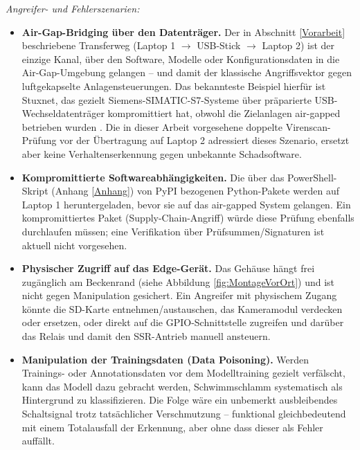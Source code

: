 \textit{Angreifer- und Fehlerszenarien:}
\begin{itemize}
    \item \textbf{Air-Gap-Bridging über den Datenträger.} Der in Abschnitt \ref{Vorarbeit} beschriebene Transferweg (Laptop 1 $\rightarrow$ USB-Stick $\rightarrow$ Laptop 2) ist der einzige Kanal, über den Software, Modelle oder Konfigurationsdaten in die Air-Gap-Umgebung gelangen -- und damit der klassische Angriffsvektor gegen luftgekapselte Anlagensteuerungen. Das bekannteste Beispiel hierfür ist Stuxnet, das gezielt Siemens-SIMATIC-S7-Systeme über präparierte USB-Wechseldatenträger kompromittiert hat, obwohl die Zielanlagen air-gapped betrieben wurden \cite{Langner_2011}. Die in dieser Arbeit vorgesehene doppelte Virenscan-Prüfung vor der Übertragung auf Laptop 2 adressiert dieses Szenario, ersetzt aber keine Verhaltenserkennung gegen unbekannte Schadsoftware.
    \item \textbf{Kompromittierte Softwareabhängigkeiten.} Die über das PowerShell-Skript (Anhang \ref{Anhang}) von PyPI bezogenen Python-Pakete werden auf Laptop 1 heruntergeladen, bevor sie auf das air-gapped System gelangen. Ein kompromittiertes Paket (Supply-Chain-Angriff) würde diese Prüfung ebenfalls durchlaufen müssen; eine Verifikation über Prüfsummen/Signaturen ist aktuell nicht vorgesehen.
    \item \textbf{Physischer Zugriff auf das Edge-Gerät.} Das Gehäuse hängt frei zugänglich am Beckenrand (siehe Abbildung \ref{fig:MontageVorOrt}) und ist nicht gegen Manipulation gesichert. Ein Angreifer mit physischem Zugang könnte die SD-Karte entnehmen/austauschen, das Kameramodul verdecken oder ersetzen, oder direkt auf die GPIO-Schnittstelle zugreifen und darüber das Relais und damit den SSR-Antrieb manuell ansteuern.
    \item \textbf{Manipulation der Trainingsdaten (Data Poisoning).} Werden Trainings- oder Annotationsdaten vor dem Modelltraining gezielt verfälscht, kann das Modell dazu gebracht werden, Schwimmschlamm systematisch als Hintergrund zu klassifizieren. Die Folge wäre ein unbemerkt ausbleibendes Schaltsignal trotz tatsächlicher Verschmutzung -- funktional gleichbedeutend mit einem Totalausfall der Erkennung, aber ohne dass dieser als Fehler auffällt.
\end{itemize}

